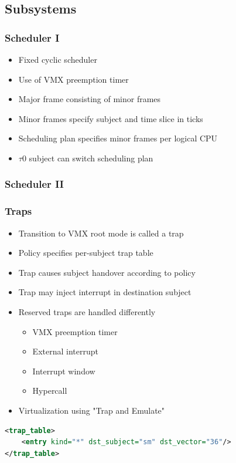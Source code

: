 \documentclass[xcolor={dvipsnames}]{beamer}
\begin{document}
\subsection{Subsystems}
\begin{frame}\frametitle{Scheduler I}
\begin{itemize}
	\item Fixed cyclic scheduler
	\item Use of VMX preemption timer
	\item Major frame consisting of minor frames
	\item Minor frames specify subject and time slice in ticks
	\item Scheduling plan specifies minor frames per logical CPU
	\item $\tau$0 subject can switch scheduling plan
\end{itemize}

\end{frame}

\begin{frame}\frametitle{Scheduler II}
\begin{center}
	
\end{center}
\end{frame}

\begin{frame}[fragile]\frametitle{Traps}
\begin{itemize}
	\item Transition to VMX root mode is called a trap
	\item Policy specifies per-subject trap table
	\item Trap causes subject handover according to policy
	\item Trap may inject interrupt in destination subject
	\item Reserved traps are handled differently
		\begin{itemize}
			\item VMX preemption timer
			\item External interrupt
			\item Interrupt window
			\item Hypercall
		\end{itemize}
	\item Virtualization using "Trap and Emulate"
\end{itemize}
\begin{lstlisting}[language=xml]
<trap_table>
    <entry kind="*" dst_subject="sm" dst_vector="36"/>
</trap_table>
\end{lstlisting}
\end{frame}
\end{document}
